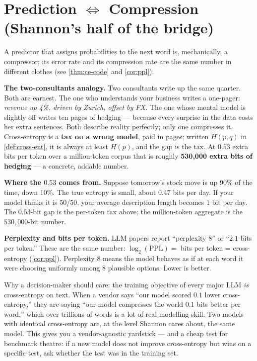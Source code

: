 \documentclass[12pt,a4paper]{article}
\theoremstyle{plain}
\theoremstyle{definition}
\begin{document}
\section{Prediction \texorpdfstring{$\Leftrightarrow$}{<=>} Compression
         (Shannon's half of the bridge)}
\label{sec:pred-comp}

\begin{intuition}
A predictor that assigns probabilities to the next word is, mechanically,
a compressor; its error rate and its compression rate are the same number
in different clothes (see \cref{thm:ce-code} and \cref{cor:ppl}).

\textbf{The two-consultants analogy.}  Two consultants write up the
same quarter.  Both are earnest.  The one who understands your
business writes a one-pager: \emph{revenue up 4\%, driven by Zurich,
offset by FX.}  The one whose mental model is slightly off writes
ten pages of hedging --- because every surprise in the data costs
her extra sentences.  Both describe reality perfectly; only one
compresses it.  Cross-entropy is a \textbf{tax on a wrong model},
paid in pages; written $H(p,q)$ in \cref{def:cross-ent}, it is
always at least $H(p)$, and the gap is the tax.  At $0.53$ extra
bits per token over a million-token corpus that is roughly
\textbf{530{,}000 extra bits of hedging} --- a concrete, addable
number.

\textbf{Where the $0.53$ comes from.}  Suppose tomorrow's stock move
is up $90\%$ of the time, down $10\%$.  The true entropy is small,
about $0.47$ bits per day.  If your model thinks it is 50/50, your
average description length becomes $1$ bit per day.  The $0.53$-bit
gap is the per-token tax above; the million-token aggregate is the
$530{,}000$-bit number.

\textbf{Perplexity and bits per token.}  LLM papers report
``perplexity 8'' or ``$2.1$ bits per token.''  These are the same
number: $\log_2(\mathrm{PPL}) = $ bits per token = cross-entropy
(\cref{cor:ppl}).  Perplexity $8$ means the model behaves as if at
each word it were choosing uniformly among $8$ plausible options.
Lower is better.

Why a decision-maker should care: the training objective of every
major LLM \emph{is} cross-entropy on text.  When a vendor says ``our
model scored $0.1$ lower cross-entropy,'' they are saying ``our model
compresses the world $0.1$ bits better per word,'' which over
trillions of words is a lot of real modelling skill.  Two models with
identical cross-entropy are, at the level Shannon cares about, the
same model.  This gives you a vendor-agnostic yardstick --- and a
cheap test for benchmark theatre: if a new model does not improve
cross-entropy but wins on a specific test, ask whether the test was
in the training set.
\end{intuition}
\end{document}
